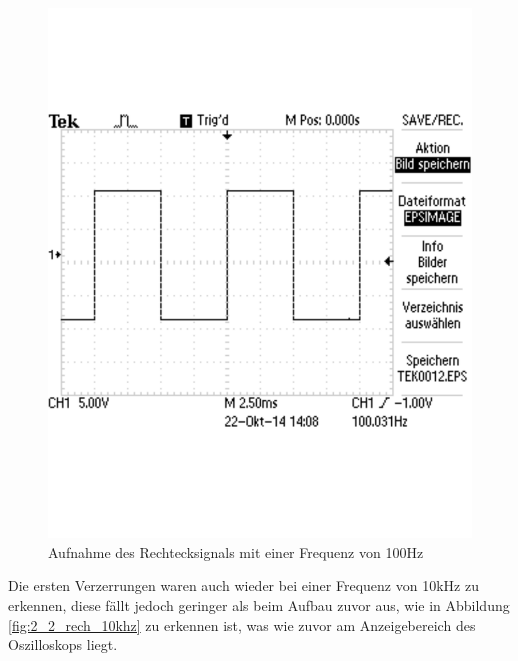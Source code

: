 \documentclass[12pt,a4paper]{article}
\begin{document}
\begin{figure}[H] 
  \centering
    \includegraphics[scale = 0.4]{2_2_rech_100hz.pdf}
  	\caption[Aufnahme des Rechtecksignals mit einer Frequenz von 100Hz]{Aufnahme des Rechtecksignals mit einer Frequenz von 100Hz}
  \label{fig:2_2_rech_100hz}
\end{figure}

Die ersten Verzerrungen waren auch wieder bei einer Frequenz von 10kHz zu erkennen, diese fällt jedoch geringer als beim Aufbau zuvor aus, wie in Abbildung \ref{fig:2_2_rech_10khz} zu erkennen ist, was wie zuvor am Anzeigebereich des Oszilloskops liegt.
\end{document}
